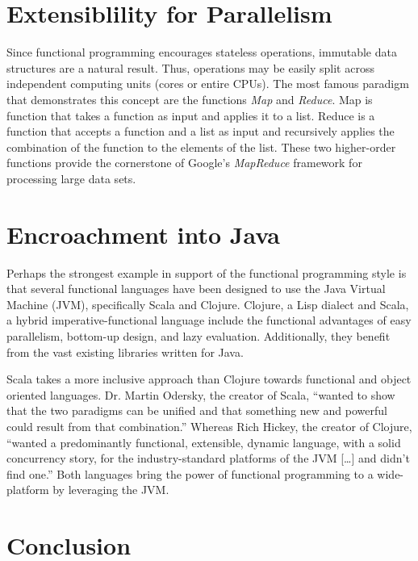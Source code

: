 \documentclass[prodmode]{acmlarge}
\begin{document}
\section{Extensiblility for Parallelism}

Since functional programming encourages stateless operations,
immutable data structures are a natural result.  Thus, operations may
be easily split across independent computing units (cores or entire
CPUs).  The most famous paradigm that demonstrates this concept are
the functions \emph{Map} and \emph{Reduce}.  Map is function that
takes a function as input and applies it to a list.  Reduce is a
function that accepts a function and a list as input and recursively
applies the combination of the function to the elements of the list.
These two higher-order functions provide the cornerstone of Google's
\emph{MapReduce} framework for processing large data sets.

\section{Encroachment into Java}

Perhaps the strongest example in support of the functional programming
style is that several functional languages have been designed to use
the Java Virtual Machine (JVM), specifically Scala and Clojure.
Clojure, a Lisp dialect and Scala, a hybrid imperative-functional
language include the functional advantages of easy parallelism,
bottom-up design, and lazy evaluation.  Additionally, they benefit
from the vast existing libraries written for Java.

Scala takes a more inclusive approach than Clojure towards functional
and object oriented languages.  Dr. Martin Odersky, the creator of
Scala, ``wanted to show that the two paradigms can be unified and that
something new and powerful could result from that
combination.\cite{Tate:2010:SLS:1951955}''  Whereas Rich Hickey, the
creator of Clojure, ``wanted a predominantly functional, extensible,
dynamic language, with a solid concurrency story, for the
industry-standard platforms of the JVM [\ldots] and didn't find
one.\cite{Tate:2010:SLS:1951955}''  Both languages bring the power of
functional programming to a wide-platform by leveraging the JVM.

\section{Conclusion}
\end{document}
